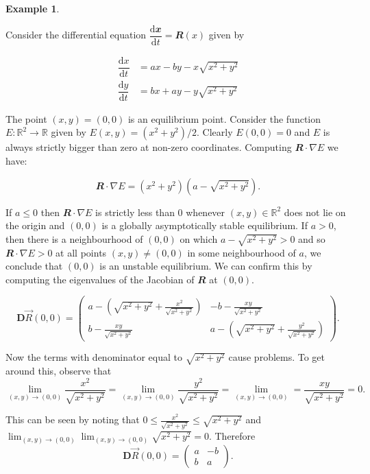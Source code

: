 \documentclass[
  a4paper,
  oneside,
  final]{krantz}
\newcommand{\R}{\mathbb{R}}
\renewcommand{\d}{\mathrm{d}}
\renewcommand{\v}[1]{{\mathbfit{#1}}}
\newcommand{\der}[2]{\dfrac{\d #1}{\d #2}}
\newcommand{\jacobr}{\mathbf{D}\vec{R}}
\theoremstyle{definition}
\theoremstyle{definition}
\newtheorem{example}{Example}[chapter]
\theoremstyle{definition}
\theoremstyle{definition}
\theoremstyle{remark}
\begin{document}
\begin{example}
\protect\hypertarget{exm:spiralexampleII}{}\label{exm:spiralexampleII}

Consider the differential equation \(\der{\v{x}}{t} = \v{R}(x)\) given by

\begin{align}
 \der{x}{t} &= ax -by - x \sqrt{x^2 + y^2} \\
 \der{y}{t} &= bx +ay -y \sqrt{x^2+y^2} 
 \label{eq:ode2d}
\end{align}

The point \((x,y) = (0,0)\) is an equilibrium point. Consider the function \(E: \R^2 \to \R\) given by \(E(x,y) = (x^2 + y^2)/2\). Clearly \(E(0,0) = 0\) and \(E\) is always strictly bigger than zero at non-zero coordinates. Computing \(\v{R} \cdot \nabla E\) we have:

\[\v{R} \cdot \nabla E = (x^2 +y^2)\left(a- \sqrt{x^2 + y^2}\right).\]

If \(a\le 0\) then \(\v{R} \cdot \nabla E\) is strictly less than \(0\) whenever \((x,y) \in \R^2\) does not lie on the origin and \((0,0)\) is a globally asymptotically stable equilibrium. If \(a>0\), then there is a neighbourhood of \((0,0)\) on which \(a - \sqrt{x^2 + y^2} >0\) and so \(\v{R} \cdot \nabla E >0\) at all points \((x,y) \ne (0,0)\) in some neighbourhood of \(a\), we conclude that \((0,0)\) is an unstable equilibrium. We can confirm this by computing the eigenvalues of the Jacobian of \(\v{R}\) at \((0,0)\).

\[
\jacobr(0,0) = \begin{pmatrix} a - \left( \sqrt{x^2 + y^2} + \frac{x^2}{\sqrt{x^2 + y^2}}  \right) & -b - \frac{xy}{\sqrt{x^2 + y^2}} \\ b - \frac{xy}{\sqrt{x^2 + y^2}} & a - \left( \sqrt{x^2 + y^2} + \frac{y^2}{\sqrt{x^2 +y^2}}  \right)   \end{pmatrix}
.\]

Now the terms with denominator equal to \(\sqrt{x^2 + y^2}\) cause problems. To get around this, observe that \[\lim_{(x,y) \to (0,0)} \frac{x^2}{\sqrt{x^2 + y^2}} = \lim_{(x,y) \to (0,0)} \frac{y^2}{\sqrt{x^2 + y^2}} = \lim_{(x,y) \to (0,0)}= \frac{xy}{\sqrt{x^2 + y^2}} = 0.\]

This can be seen by noting that \(0 \le \frac{x^2}{\sqrt{x^2 + y^2}} \le \sqrt{x^2 + y^2}\) and \(\lim_{(x,y) \to (0,0)} \lim_{(x,y) \to (0,0)} \sqrt{x^2 + y^2} = 0\). Therefore \[
\jacobr(0,0) = \begin{pmatrix} a   & -b \\ b  & a \end{pmatrix}
.\]


\end{example}
\end{document}

